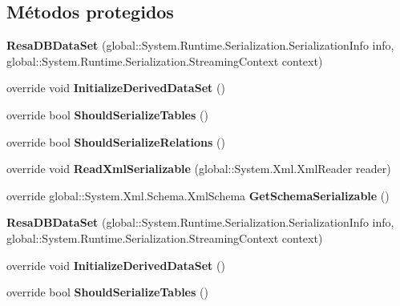 \subsection*{Métodos protegidos}
\begin{DoxyCompactItemize}
\item 
{\bfseries Resa\+D\+B\+Data\+Set} (global\+::\+System.\+Runtime.\+Serialization.\+Serialization\+Info info, global\+::\+System.\+Runtime.\+Serialization.\+Streaming\+Context context)\label{class_resa___pro_1_1_resa_d_b_data_set_a2738888f29281a3916144ba75858b97b}

\item 
override void {\bfseries Initialize\+Derived\+Data\+Set} ()\label{class_resa___pro_1_1_resa_d_b_data_set_a90aa5b582a92abad9b6048ec0b69f350}

\item 
override bool {\bfseries Should\+Serialize\+Tables} ()\label{class_resa___pro_1_1_resa_d_b_data_set_a1ae80ade950725c6d31dab9a451930ca}

\item 
override bool {\bfseries Should\+Serialize\+Relations} ()\label{class_resa___pro_1_1_resa_d_b_data_set_a8ec113b648b161171a15b573716bf371}

\item 
override void {\bfseries Read\+Xml\+Serializable} (global\+::\+System.\+Xml.\+Xml\+Reader reader)\label{class_resa___pro_1_1_resa_d_b_data_set_af6b107ce1956604eda441a315e6fcb54}

\item 
override global\+::\+System.\+Xml.\+Schema.\+Xml\+Schema {\bfseries Get\+Schema\+Serializable} ()\label{class_resa___pro_1_1_resa_d_b_data_set_a63c240e1194fc8bc9334faa718bac9b3}

\item 
{\bfseries Resa\+D\+B\+Data\+Set} (global\+::\+System.\+Runtime.\+Serialization.\+Serialization\+Info info, global\+::\+System.\+Runtime.\+Serialization.\+Streaming\+Context context)\label{class_resa___pro_1_1_resa_d_b_data_set_a2738888f29281a3916144ba75858b97b}

\item 
override void {\bfseries Initialize\+Derived\+Data\+Set} ()\label{class_resa___pro_1_1_resa_d_b_data_set_a90aa5b582a92abad9b6048ec0b69f350}

\item 
override bool {\bfseries Should\+Serialize\+Tables} ()\label{class_resa___pro_1_1_resa_d_b_data_set_a1ae80ade950725c6d31dab9a451930ca}


\end{DoxyCompactItemize}
